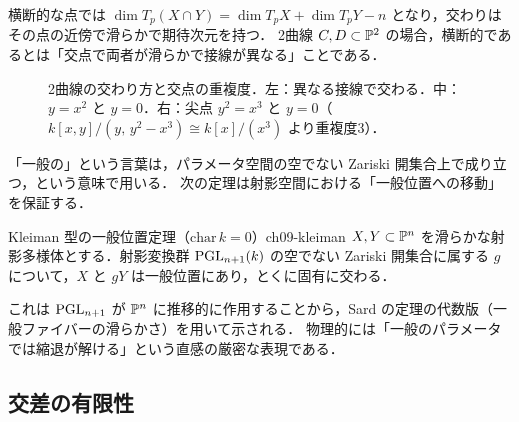 横断的な点では $\dim T_p(X\cap Y)=\dim T_pX+\dim T_pY-n$ となり，交わりはその点の近傍で滑らかで期待次元を持つ．
2曲線 $C,D\subset\mathbb{P}^2$ の場合，横断的であるとは「交点で両者が滑らかで接線が異なる」ことである．

\begin{figure}[htbp]
\centering
{}
\caption{2曲線の交わり方と交点の重複度．左：異なる接線で交わる．中：$y=x^2$ と $y=0$．右：尖点 $y^2=x^3$ と $y=0$（$k[x,y]/(y,\,y^2-x^3)\cong k[x]/(x^3)$ より重複度3）．}
\label{fig:ch09-transversal}
\end{figure}

「一般の」という言葉は，パラメータ空間の空でない Zariski 開集合上で成り立つ，という意味で用いる．
次の定理は射影空間における「一般位置への移動」を保証する．

\begin{mythm}{Kleiman 型の一般位置定理（$\mathrm{char}\,k=0$）}{ch09-kleiman}
$X,Y\subset\mathbb{P}^n$ を滑らかな射影多様体とする．射影変換群 $\operatorname{PGL}_{n+1}(k)$ の空でない Zariski 開集合に属する $g$ について，$X$ と $gY$ は一般位置にあり，とくに固有に交わる．
\end{mythm}

これは $\operatorname{PGL}_{n+1}$ が $\mathbb{P}^n$ に推移的に作用することから，Sard の定理の代数版（一般ファイバーの滑らかさ）を用いて示される．
物理的には「一般のパラメータでは縮退が解ける」という直感の厳密な表現である．

\subsection{交差の有限性}

